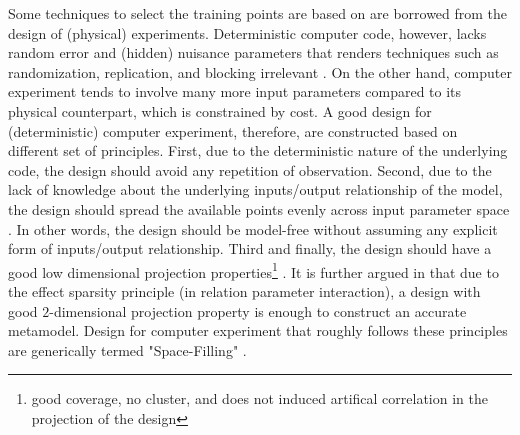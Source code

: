 Some techniques to select the training points are based on are borrowed from the design of (physical) experiments.
Deterministic computer code, however, lacks random error and (hidden) nuisance parameters that renders techniques such as randomization, replication, and blocking irrelevant \cite{Santner2003}.
On the other hand, computer experiment tends to involve many more input parameters compared to its physical counterpart, which is constrained by cost. 
A good design for (deterministic) computer experiment, therefore, are constructed based on different set of principles.
First, due to the deterministic nature of the underlying code, the design should avoid any repetition of observation. 
Second, due to the lack of knowledge about the underlying inputs/output relationship of the model, the design should spread the available points evenly across input parameter space \cite{Santner2003}.
In other words, the design should be model-free without assuming any explicit form of inputs/output relationship.
Third and finally, the design should have a good low dimensional projection properties\footnote{good coverage, no cluster, and does not induced artifical correlation in the projection of the design} \cite{Jin2003,Damblin2013}.
It is further argued in \cite{Damblin2013} that due to the effect sparsity principle (in relation parameter interaction), 
a design with good $2$-dimensional projection property is enough to construct an accurate metamodel.   
Design for computer experiment that roughly follows these principles are generically termed "Space-Filling" \cite{Simpson2001a,Jin2003,Santner2003,Chen2006,Damblin2013}.


